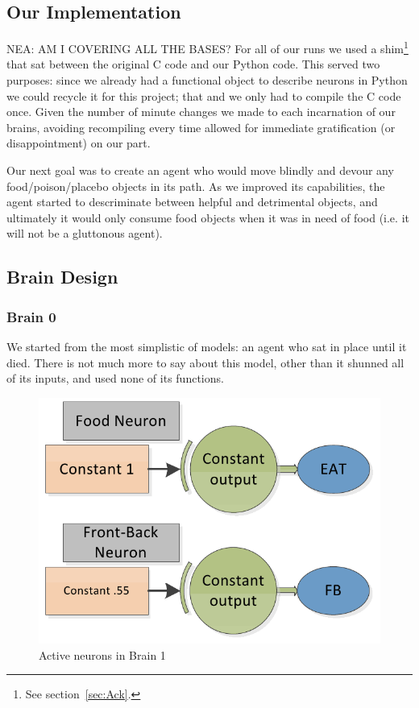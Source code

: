 \subsection{Our Implementation}
{\Large NEA: AM I COVERING ALL THE BASES?}
For all of our runs we used a shim\footnote{See section~\ref{sec:Ack}.} that 
sat between the original C code and our Python code. This served two purposes:
since we already had a functional object to describe neurons in Python we could
recycle it for this project; that and we only had to compile the C code once.
Given the number of minute changes we made to each incarnation of our brains,
avoiding recompiling every time allowed for immediate gratification (or 
disappointment) on our part.

 Our next goal was to create an agent who
would move blindly and devour any food/poison/placebo objects in its path.
As we improved its capabilities, the agent started to descriminate between 
helpful and detrimental objects, and ultimately it would only consume food 
objects when it was in need of food (i.e. it will not be a gluttonous agent).

\subsection{Brain Design}

\subsubsection{Brain 0}
We started from the most simplistic of models: an agent who sat in place until
it died. There is not much more to say about this model, other than it shunned
all of its inputs, and used none of its functions.

\begin{figure}
\begin{center}
  \includegraphics[scale=.3]{img/brain1.png}
  \caption{Active neurons in Brain 1}
  \label{fig:brain1}
\end{center}
\end{figure}


